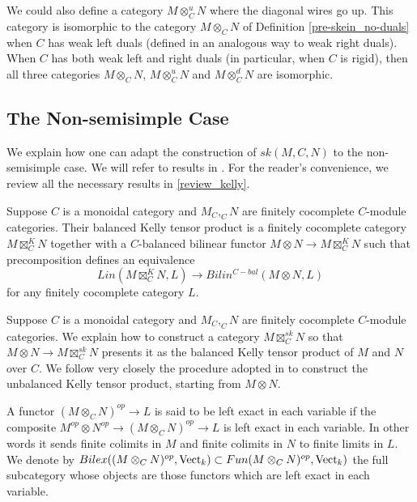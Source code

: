   \begin{remark}
   We could also define a category $M\otimes_C^u N$ where the diagonal wires go up. This category is isomorphic to the category $M\otimes_C N$ of Definition \ref{pre-skein_no-duals} when $C$ has weak left duals (defined in an analogous way to weak right duals). When $C$ has both weak left and right duals (in particular, when $C$ is rigid), then all three categories $M\otimes_C N$, $M\otimes^u_C N$ and $M\otimes_C^d N$ are isomorphic.\end{remark}

\subsection{The Non-semisimple Case} \label{section-nonsemisimple}

We explain how one can adapt the construction of $sk(M,C,N)$ to the non-semisimple case. We will refer to results in \cite{kelly/basic-concepts-enriched}. For the reader's convenience, we review all the necessary results in \ref{review_kelly}.

\begin{definition}
Suppose $C$ is a monoidal category and $M_C, _{C}N$ are finitely cocomplete $C$-module categories. Their balanced Kelly tensor product is a finitely cocomplete category $M\boxtimes^K_C N$ together with a $C$-balanced bilinear functor $M\otimes N\to M\boxtimes^K_C N$ such that precomposition defines an equivalence $$Lin(M\boxtimes^K_C N,L)\to Bilin^{C-bal}(M\otimes N, L)$$ for any finitely cocomplete category $L$.\end{definition}

Suppose $C$ is a monoidal category and $M_C, _{C}N$ are finitely cocomplete $C$-module categories. We explain how to construct a category $M\boxtimes_C^{sk}N$ so that $M\otimes N\to M\boxtimes_C^{sk}N$ presents it as the balanced Kelly tensor product of $M$ and $N$ over $C$. We follow very closely the procedure adopted in \cite{lopezfranco/tensor-products} to construct the unbalanced Kelly tensor product, starting from $M\otimes N$.

\begin{definition}

A functor $(M\otimes_C N)^{op}\to L$ is said to be left exact in each variable if the composite $M^{op}\otimes N^{op}\to (M\otimes_C N)^{op}\to L$ is left exact in each variable. In other words it sends finite colimits in $M$ and finite colimits in $N$ to finite limits in $L$. We denote by $Bilex((M\otimes_C N)^{op},\operatorname{Vect}_k)\subset Fun(M\otimes_C N)^{op},\operatorname{Vect}_k)$ the full subcategory whose objects are those functors which are left exact in each variable.
\end{definition}


